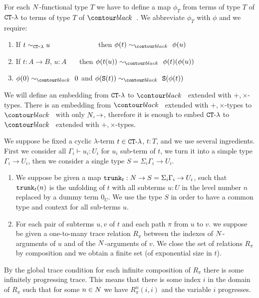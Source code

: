 For each ${N}$-functional type $T$ we have to define a map $\phi_T$ from terms of type $T$ of ${ {\tt CT} \mbox{-} \lambda}$
to terms of type $T$ of $\systemT$. We abbreviate $\phi_T$ with $\phi$ and we require:

\begin{enumerate}
\item
If $t \sim_{{ {\tt CT} \mbox{-} \lambda}} u$ \ \ \ \ \ \ \ \ \ \ \ \ \ then $\phi(t) \sim_{\systemT} \phi(u)$

\item
If $t: A \rightarrow B$, $u:A$ \ \ \ then $\phi(t(u)) \sim_{\systemT} \phi(t)(\phi(u))$

\item
$\phi(0) \sim_{\systemT} 0$ and
$\phi(\Succ(t)) \sim_{\systemT} \Succ(\phi(t))$

\end{enumerate}

We will define an embedding from ${ {\tt CT} \mbox{-} \lambda}$ to $\systemT$ extended with $+,\times$-types.
There is an embedding from  $\systemT$ extended with $+,\times$-types to  $\systemT$ with only
${N}, \rightarrow$, therefore it is enough to embed ${ {\tt CT} \mbox{-} \lambda}$ to $\systemT$ extended with $+,\times$-types.

We suppose be fixed a cyclic $\lambda$-term $t \in { {\tt CT} \mbox{-} \lambda}$, $t : T$,
 and we use several ingredients. First we consider all $\Gamma_i \vdash u_i : U_i$ for $u_i$ sub-term of $t$,
we turn it into a simple type $\Gamma_i \rightarrow U_i$, then we consider a single type
$S = \Sigma_i \Gamma_i \rightarrow U_i$. 


\begin{enumerate}
\item
We suppose be given a map ${\tt trunk}_t:{N} \rightarrow S = \Sigma_i \Gamma_i \rightarrow U_i$, 
such that ${\tt trunk}_t(n)$ is 
the unfolding of $t$ with all subterms $u:U$ in the level number $n$ replaced by a dummy term $0_U$.
We use the type $S$ in order to have a common type and context for all sub-terms $u$.

\item
For each pair of subterms $u,v$ of $t$ and each path $\pi$ from $u$ to $v$. 
we suppose be given a one-to-many trace
relation $R_\pi$ between the indexes of ${N}$-arguments of $u$ and of the ${N}$-arguments of $v$. 
We close the set of relations $R_\pi$ by composition 
and we obtain a finite set (of exponential size in $t$).
\end{enumerate}

By the global trace condition for each infinite composition of $R_\pi$ there is some infinitely progressing
trace. This means that there is some index $i$ in the domain of $R_\pi$ such that for some $n \in {N}$
we have $R^n_\pi(i,i)$ and the variable $i$ progresses.



